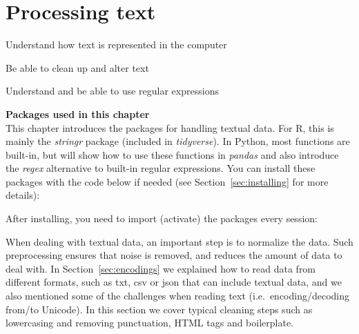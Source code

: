 \chapter{Processing text}
\label{chap:protext}


\begin{abstract}{Abstract}
Many datasets that are relevant for social science consist of textual data, from political discussions and newspaper archives to open-ended survey questions and reviews. This chapter gives an introduction to dealing with textual data using base functions in Python and (mostly) the \emph{stringr} package in R.
\end{abstract}


\begin{objectives}
\item Understand how text is represented in the computer
\item Be able to clean up and alter text
\item Understand and be able to use regular expressions
\end{objectives}


\newpage
\begin{feature}
  \textbf{Packages used in this chapter}\\
  This chapter introduces the packages for handling textual data.
  For R, this is mainly the \emph{stringr} package (included in \emph{tidyverse}).
  In Python, most functions are built-in, but will show how to use these functions in \emph{pandas} and also introduce the \emph{regex} alternative to built-in regular expressions.
You can install these packages with the code below if needed  (see Section~\ref{sec:installing} for more details):


\noindent After installing, you need to import (activate) the packages every session:


\end{feature}

%

When dealing with textual data, an important step is to normalize the data. Such preprocessing ensures that noise is removed, and reduces the amount of data to deal with. In Section~\ref{sec:encodings} we explained how to read data from different formats, such as txt, csv or json that can include textual data, and we also mentioned some of the challenges when reading text (i.e.\ encoding/decoding from/to Unicode). In this section we cover typical cleaning steps such as lowercasing and removing punctuation, HTML tags and boilerplate.

